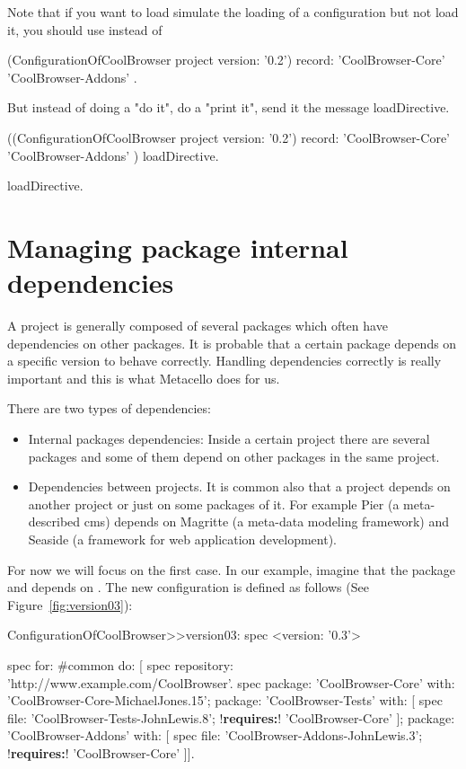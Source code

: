 \documentclass[a4paper,10pt,twoside]{book}
\begin{document}
Note that if you want to load simulate the loading of a configuration but not load it, you should use  instead of 

\begin{code}{}
  (ConfigurationOfCoolBrowser project version: '0.2') record: { 'CoolBrowser-Core' 'CoolBrowser-Addons' }.
\end{code}

But instead of doing a "do it", do a "print it", send it the message loadDirective.

\begin{code}{}
  ((ConfigurationOfCoolBrowser project version: '0.2') record: { 'CoolBrowser-Core' 'CoolBrowser-Addons' }) loadDirective.
\end{code} loadDirective.


\section{Managing package internal dependencies}

A project is generally composed of several packages which often have dependencies on other packages.  It is probable that a certain package depends on a specific version to behave correctly. Handling dependencies correctly is really important and this is what Metacello does for us. 

There are two types of dependencies:
\begin{itemize}
\item Internal packages dependencies: Inside a certain project there are several packages and some of them depend on other packages in the same project. 
\item Dependencies between projects. It is common also that a project depends on another project or just on some packages of it. For example Pier (a meta-described cms) depends on Magritte (a meta-data modeling framework) and Seaside (a framework for web application development).
\end{itemize}

For now we will focus on the first case. In our example, imagine that the package  and  depends on . The new configuration  is defined as follows (See Figure~\ref{fig:version03}):

\begin{code}{}
ConfigurationOfCoolBrowser>>version03: spec 
       <version: '0.3'>
       
       spec for: #common do: [
              spec repository: 'http://www.example.com/CoolBrowser'.
              spec 
                     package: 'CoolBrowser-Core' with: 'CoolBrowser-Core-MichaelJones.15';
                     package: 'CoolBrowser-Tests' with: [
                            spec 
                                   file: 'CoolBrowser-Tests-JohnLewis.8';
                                   !\textbf{requires:}! 'CoolBrowser-Core' ];
                     package: 'CoolBrowser-Addons' with: [
                            spec 
                                   file: 'CoolBrowser-Addons-JohnLewis.3';
                                   !\textbf{requires:}! 'CoolBrowser-Core' ]].
\end{code}
\end{document}

